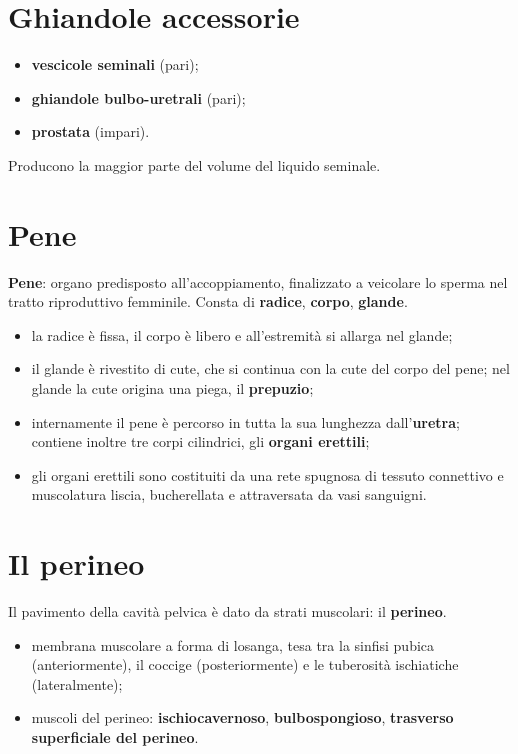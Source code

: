 \section{Ghiandole accessorie}

\begin{itemize}
  \item \textbf{vescicole seminali} (pari);
  \item \textbf{ghiandole bulbo-uretrali} (pari);
  \item \textbf{prostata} (impari).
\end{itemize}
Producono la maggior parte del volume del liquido seminale.

\section{Pene}

\textbf{Pene}: organo predisposto all'accoppiamento, finalizzato a veicolare lo sperma nel tratto
riproduttivo femminile. Consta di \textbf{radice}, \textbf{corpo}, \textbf{glande}.
\begin{itemize}
  \item la radice è fissa, il corpo è libero e all'estremità si allarga nel glande;
  \item il glande è rivestito di cute, che si continua con la cute del corpo del pene; nel glande
    la cute origina una piega, il \textbf{prepuzio};
  \item internamente il pene è percorso in tutta la sua lunghezza dall'\textbf{uretra}; contiene
    inoltre tre corpi cilindrici, gli \textbf{organi erettili};
  \item gli organi erettili sono costituiti da una rete spugnosa di tessuto connettivo e
    muscolatura liscia, bucherellata e attraversata da vasi sanguigni.
\end{itemize}

\section{Il perineo}

Il pavimento della cavità pelvica è dato da strati muscolari: il \textbf{perineo}.
\begin{itemize}
  \item membrana muscolare a forma di losanga, tesa tra la sinfisi pubica (anteriormente), il
    coccige (posteriormente) e le tuberosità ischiatiche (lateralmente);
  \item muscoli del perineo: \textbf{ischiocavernoso}, \textbf{bulbospongioso}, \textbf{trasverso
    superficiale del perineo}.
\end{itemize}

